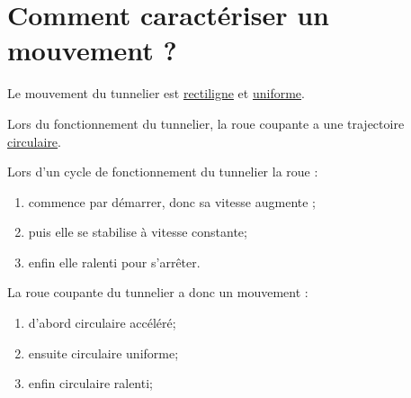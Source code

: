 \section{Comment caractériser un mouvement ?}

\begin{questions}
	\question Le mouvement du tunnelier est \underline{rectiligne} et \underline{uniforme}.
	
	\question Lors du fonctionnement du tunnelier, la roue coupante a une trajectoire \underline{circulaire}.
	
	\question Lors d'un cycle de fonctionnement du tunnelier la roue :
	\begin{enumerate}
		\item commence par démarrer, donc sa vitesse augmente ;
		\item puis elle se stabilise à vitesse constante;
		\item enfin elle ralenti pour s'arrêter.
	\end{enumerate} 

	\question La roue coupante du tunnelier a donc un mouvement :
	\begin{enumerate}
		\item d'abord circulaire accéléré;
		\item ensuite circulaire uniforme;
		\item enfin circulaire ralenti;
	\end{enumerate} 
\end{questions}